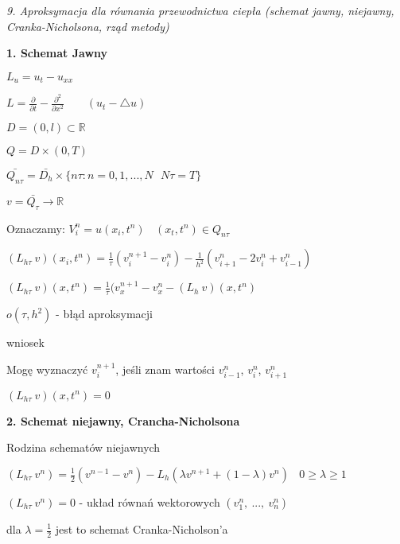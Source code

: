 \textit{9. Aproksymacja dla równania przewodnictwa ciepła (schemat jawny, niejawny, Cranka-Nicholsona, rząd metody)}

\textbf{1. Schemat Jawny}

$L_u = u_t - u_{xx}$

$L = \frac{\partial}{\partial t} - \frac{\partial^2}{\partial x^2}\ \ \ \ \ \ \ \ \ (u_t - \bigtriangleup u)$

$D = (0,l) \subset \mathbb{R}$

$Q = D \times (0,T)$

$\bar{Q_{n\tau}} = \bar{D_h} \times \{ n\tau : n = 0, 1, ..., N\ \ \ N\tau = T\}$

$v = \bar{Q_\tau} \rightarrow \mathbb{R}$

Oznaczamy: $V^n_i = u(x_i,t^n)\ \ \ \ (x_t,t^n) \in Q_{n\tau}$

$(L_{h\tau}\ v)(x_i, t^n) = \frac{1}{\tau} (v^{n+1}_i - v^n_i) - \frac{1}{h^2} (v^n_{i+1} - 2v^n_i + v^n_{i-1})$

$(L_{h\tau}\ v)(x, t^n) = \frac{1}{\tau} (v^{n+1}_x - v^n_x - (L_h\ v)(x, t^n)$

$o(\tau, h^2)$ - błąd aproksymacji

wniosek

Mogę wyznaczyć $v^{n+1}_i$, jeśli znam wartości $v^{n}_{i-1}$, $v^{n}_{i}$, $v^{n}_{i+1}$

$(L_{h\tau}\ v)(x, t^n) = 0$

\textbf{2. Schemat niejawny, Crancha-Nicholsona}

Rodzina schematów niejawnych

$(L_{h\tau}\ v^n) = \frac{1}{2} (v^{n-1} - v^{n}) - L_h (\lambda v^{n+1} + (1-\lambda)v^{n})\ \ \ \ 0 \geqslant \lambda \geqslant 1$

$(L_{h\tau}\ v^n) = 0$ - układ równań wektorowych $(v^n_1,\ ...,\ v^n_n)$

dla $\lambda = \frac{1}{2}$ jest to schemat Cranka-Nicholson'a

